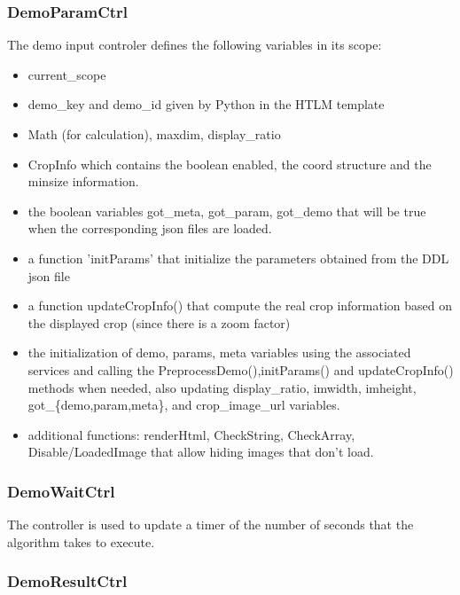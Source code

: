 \subsubsection{DemoParamCtrl}

The demo input controler defines the following variables in its scope:
\begin{itemize}
  \item current\_scope
  \item demo\_key and demo\_id given by Python in the HTLM template
  \item Math (for calculation), maxdim, display\_ratio
  \item CropInfo which contains the boolean enabled, the coord structure and
        the minsize information.
  \item the boolean variables got\_meta, got\_param, got\_demo that will be true
        when the corresponding json files are loaded.
  \item a function 'initParams' that initialize the parameters obtained from 
        the DDL json file
  \item a function updateCropInfo() that compute the real crop information
        based on the displayed crop (since there is a zoom factor)
  \item the initialization of demo, params, meta variables using the associated
        services and calling the PreprocessDemo(),initParams() and updateCropInfo()
        methods when needed, also updating display\_ratio, imwidth, imheight, 
        got\_\{demo,param,meta\},
        and crop\_image\_url variables.
  \item additional functions: renderHtml, CheckString, CheckArray, 
        Disable/LoadedImage that allow hiding images that don't load.
\end{itemize}

\subsubsection{DemoWaitCtrl}

The controller is used to update a timer of the number of seconds that the algorithm
takes to execute.

\subsubsection{DemoResultCtrl} \label{sec:DemoResultCtrl}

